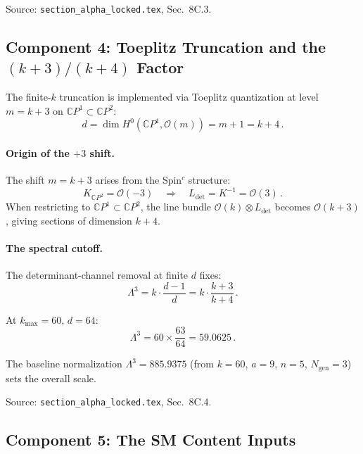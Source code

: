 \documentclass[12pt,a4paper]{article}
\begin{document}
Source: \texttt{section\_alpha\_locked.tex}, Sec.~8C.3.

\subsection{Component 4: Toeplitz Truncation and the $(k+3)/(k+4)$ Factor}

The finite-$k$ truncation is implemented via Toeplitz quantization at
level $m = k + 3$ on $\mathbb{C}P^1 \subset \mathbb{C}P^2$:
\begin{equation}
d = \dim H^0(\mathbb{C}P^1, \mathcal{O}(m)) = m + 1 = k + 4\,.
\end{equation}

\paragraph{Origin of the $+3$ shift.}
The shift $m = k + 3$ arises from the Spin$^c$ structure:
\begin{equation}
K_{\mathbb{C}P^2} = \mathcal{O}(-3) \quad \Rightarrow \quad
L_{\det} = K^{-1} = \mathcal{O}(3)\,.
\end{equation}
When restricting to $\mathbb{C}P^1 \subset \mathbb{C}P^2$, the
line bundle $\mathcal{O}(k) \otimes L_{\det}$ becomes
$\mathcal{O}(k+3)$, giving sections of dimension $k + 4$.

\paragraph{The spectral cutoff.}
The determinant-channel removal at finite $d$ fixes:
\begin{equation}
\Lambda^3 = k \cdot \frac{d-1}{d} = k \cdot \frac{k+3}{k+4}\,.
\end{equation}

At $k_{\max} = 60$, $d = 64$:
\begin{equation}
\Lambda^3 = 60 \times \frac{63}{64} = 59.0625\,.
\end{equation}

The baseline normalization $\Lambda^3 = 885.9375$ (from $k = 60$,
$a = 9$, $n = 5$, $N_{\mathrm{gen}} = 3$) sets the overall scale.

Source: \texttt{section\_alpha\_locked.tex}, Sec.~8C.4.

\subsection{Component 5: The SM Content Inputs}
\end{document}
